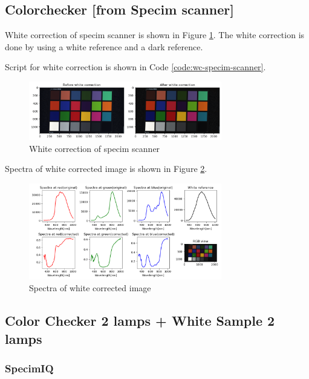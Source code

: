 \subsection{Colorchecker [from Specim scanner]}

White correction of specim scanner is shown in Figure \ref{fig:wc-specim-scanner}. 
The white correction is done by using a white reference and a dark reference. 

Script for white correction is shown in Code \ref{code:wc-specim-scanner}.

\begin{figure}[H]
    \centering
    \caption{White correction of specim scanner}
    \label{fig:wc-specim-scanner}
    \includegraphics[width=0.75\textwidth]{./fig-task1/specium-scanner.png}
\end{figure}

Spectra of white corrected image is shown in Figure \ref{fig:wc-specim-scanner-spectra}.

\begin{figure}[H]
    \centering
    \caption{Spectra of white corrected image}
    \label{fig:wc-specim-scanner-spectra}
    \includegraphics[width=0.75\textwidth]{./fig-task1/wc-specim-scanner-spectra.png}
\end{figure}

\subsection{Color Checker 2 lamps + White Sample 2 lamps}

\subsubsection{SpecimIQ}


